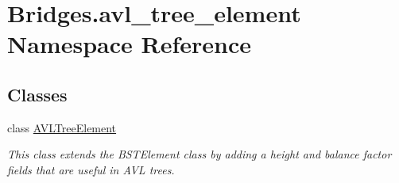 \hypertarget{namespace_bridges_1_1avl__tree__element}{}\section{Bridges.\+avl\+\_\+tree\+\_\+element Namespace Reference}
\label{namespace_bridges_1_1avl__tree__element}
\subsection*{Classes}
\begin{DoxyCompactItemize}
\item 
class \mbox{\hyperlink{class_bridges_1_1avl__tree__element_1_1_a_v_l_tree_element}{A\+V\+L\+Tree\+Element}}
\begin{DoxyCompactList}\small\item\em This class extends the B\+S\+T\+Element class by adding a height and balance factor fields that are useful in A\+VL trees. \end{DoxyCompactList}\end{DoxyCompactItemize}
